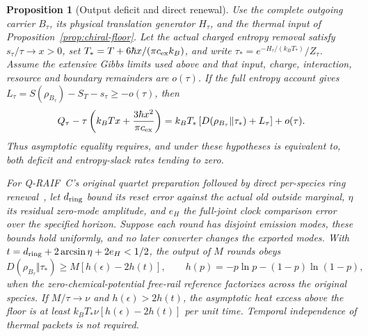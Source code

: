 \documentclass[12pt,a4paper]{article}
\newtheorem{proposition}[theorem]{Proposition}
\begin{document}
\begin{proposition}[Output deficit and direct renewal]
\label{prop:export-deficit}
Use the complete outgoing carrier $B_\tau$, its physical translation
generator $H_\tau$, and the thermal input of
Proposition~\ref{prop:chiral-floor}. Let the actual charged entropy
removal satisfy $s_\tau/\tau\to x>0$, set
$T_*=T+6\hbar x/(\pi c_{\rm ex}k_B)$, and write
$\tau_*=e^{-H_\tau/(k_BT_*)}/Z_\tau$.
Assume the extensive Gibbs limits used above and that input, charge,
interaction, resource and boundary remainders are $o(\tau)$.
If the full entropy account gives
$L_\tau=S(\rho_{B_\tau})-S_T-s_\tau\ge-o(\tau)$, then
\begin{equation}
 Q_\tau-\tau\left(k_BTx+\frac{3\hbar x^2}{\pi c_{\rm ex}}\right)
 =k_BT_*\left[D(\rho_{B_\tau}\Vert\tau_*)+L_\tau\right]+o(\tau).
 \label{eq:output-deficit}
\end{equation}
Thus asymptotic equality requires, and under these hypotheses is
equivalent to, both deficit and entropy-slack rates tending to zero.

For Q-RAIF~C's original quartet preparation followed by direct
per-species ring renewal~\cite{QRC}, let $d_{\rm ring}$ bound its
reset error against the actual old outside marginal, $\eta$ its
residual zero-mode amplitude, and $e_H$ the full-joint clock comparison
error over the specified horizon. Suppose each round has disjoint
emission modes, these bounds hold uniformly, and no later converter
changes the exported modes. With
$t=d_{\rm ring}+2\arcsin\eta+2e_H<1/2$, the output of $M$ rounds obeys
\begin{equation}
 D(\rho_{B_\tau}\Vert\tau_*)\ge
 M\left[h(\epsilon)-2h(t)\right],
 \qquad h(p)=-p\ln p-(1-p)\ln(1-p),
 \label{eq:direct-export-deficit}
\end{equation}
when the zero-chemical-potential free-rail reference factorizes across
the original species. If $M/\tau\to\nu$ and $h(\epsilon)>2h(t)$,
the asymptotic heat excess above the floor is at least
$k_BT_*\nu[h(\epsilon)-2h(t)]$ per unit time.
Temporal independence of thermal packets is not required.
\end{proposition}
\end{document}
